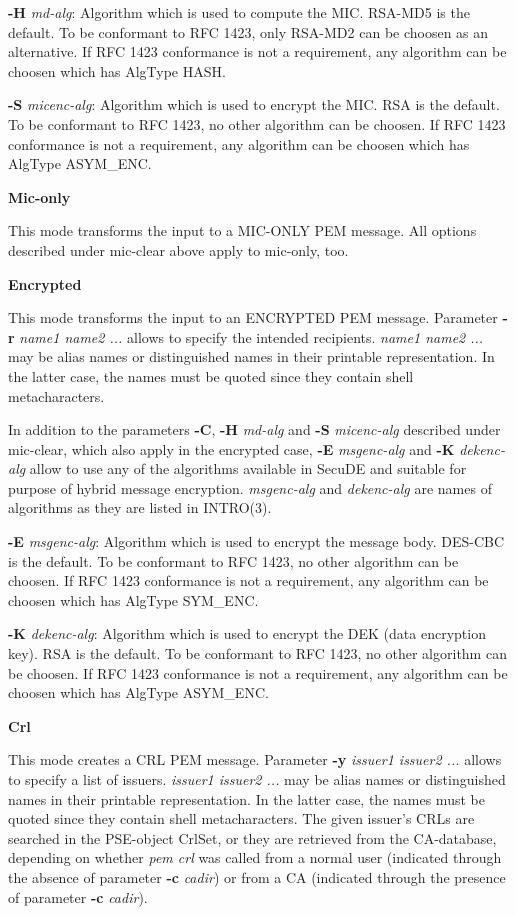 {\bf -H} {\em md-alg}: Algorithm which is used to compute the MIC. RSA-MD5 is the default.
To be conformant to RFC 1423, only RSA-MD2 can be choosen as an alternative. If RFC 1423
conformance is not a requirement, any algorithm can be choosen which has AlgType HASH.

{\bf -S} {\em micenc-alg}: Algorithm which is used to encrypt the MIC. RSA is the default.
To be conformant to RFC 1423, no other algorithm can be choosen. If RFC 1423
conformance is not a requirement, any algorithm can be choosen which has AlgType ASYM\_ENC.

{\large\bf Mic-only}

This mode transforms the input to a MIC-ONLY PEM message. All options described under mic-clear
above apply to mic-only, too.

{\large\bf Encrypted}

This mode transforms the input to an ENCRYPTED PEM message. Parameter {\bf -r} {\em name1 name2 
...}
allows to specify the intended recipients. {\em name1 name2 ...} may be alias names or distinguished
names in their printable representation. In the latter case, the names must be quoted since they
contain shell metacharacters.

In addition to the parameters {\bf -C}, {\bf -H} {\em md-alg} and {\bf -S} {\em micenc-alg} 
described under mic-clear, which also apply in the encrypted case, {\bf -E} {\em msgenc-alg} and
{\bf -K} {\em dekenc-alg} allow to use any of the algorithms available in SecuDE and suitable 
for purpose of hybrid message encryption. {\em msgenc-alg} and {\em dekenc-alg}
are names of algorithms as they are listed in INTRO(3).

{\bf -E} {\em msgenc-alg}: Algorithm which is used to encrypt the message body.
DES-CBC is the default.
To be conformant to RFC 1423, no other algorithm can be choosen. If RFC 1423
conformance is not a requirement, any algorithm can be choosen which has AlgType SYM\_ENC.

{\bf -K} {\em dekenc-alg}: Algorithm which is used to encrypt the DEK (data encryption key).
RSA is the default.
To be conformant to RFC 1423, no other algorithm can be choosen. If RFC 1423
conformance is not a requirement, any algorithm can be choosen which has AlgType ASYM\_ENC.

{\large\bf Crl}

This mode creates a CRL PEM message. Parameter {\bf -y} {\em issuer1 issuer2 ...}
allows to specify a list of issuers. {\em issuer1 issuer2 ...} may be alias names or distinguished
names in their printable representation. In the latter case, the names must be quoted since they
contain shell metacharacters. The given issuer's CRLs are searched in the PSE-object CrlSet, or they
are retrieved from the CA-database, depending on whether {\em pem crl} was called from a normal
user (indicated through the absence of parameter {\bf -c} {\em cadir}) or from a CA (indicated through 
the presence of parameter {\bf -c} {\em cadir}).


